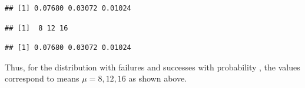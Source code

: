 \documentclass[11pt]{book}
\renewenvironment{knitrout}{\small\renewcommand{\baselinestretch}{.85}}{} %
\begin{document}
\begin{knitrout}
\color{fgcolor}\begin{kframe}
\begin{alltt}
 \hlkwb{=} 
 \hlkwb{=} \hlopt{:}
 \hlkwb{=} 
\end{alltt}
\begin{verbatim}
## [1] 0.07680 0.03072 0.01024
\end{verbatim}
\begin{alltt}
 \hlkwb{=} \hlopt{*}\hlstd{(}\hlopt{-}\hlopt{/}
\end{alltt}
\begin{verbatim}
## [1]  8 12 16
\end{verbatim}
\begin{alltt}
 
\end{alltt}
\begin{verbatim}
## [1] 0.07680 0.03072 0.01024
\end{verbatim}
\end{kframe}
\end{knitrout}
Thus, for the distribution with  failures and
  successes with probability ,
the values  correspond to means $\mu= 8, 12, 16$
as shown above.
\end{document}
